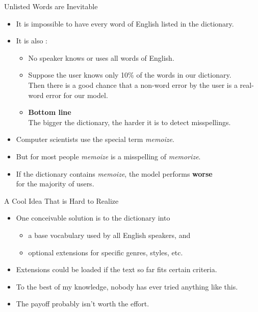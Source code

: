 \documentclass[professionalfonts, xcolor={usenames,svgnames,x11names,table}]{beamer}
\begin{document}
\begin{frame}{Unlisted Words are Inevitable}
    \begin{itemize}
        \item It is impossible to have every word of English listed in the dictionary.
        \item It is also :
            \begin{itemize}
                \item No speaker knows or uses all words of English.
                \item Suppose the user knows only 10\% of the words in our dictionary.\\
                      Then there is a good chance that a non-word error by the user is a real-word error for our model.
                \item \textbf{Bottom line}\\
                      The bigger the dictionary, the harder it is to detect misspellings.
            \end{itemize}
    \end{itemize}
    \pause
    \begin{example}
        \begin{itemize}
            \item Computer scientists use the special term \emph{memoize}.
            \item But for most people \emph{memoize} is a misspelling of \emph{memorize}.
            \item If the dictionary contains \emph{memoize}, the model performs \textbf{worse}\\
                for the majority of users.
        \end{itemize}
    \end{example}
\end{frame}

\begin{frame}{A Cool Idea That is Hard to Realize}
    \begin{itemize}
        \item One conceivable solution is to  the dictionary into
            \begin{itemize}
                \item a base vocabulary used by all English speakers, and
                \item optional extensions for specific genres, styles, etc.
            \end{itemize}
        \item Extensions could be loaded if the text so far fits certain criteria.\\
        \item To the best of my knowledge, nobody has ever tried anything like this.
        \item The payoff probably isn't worth the effort.
    \end{itemize}
\end{frame}
\end{document}
